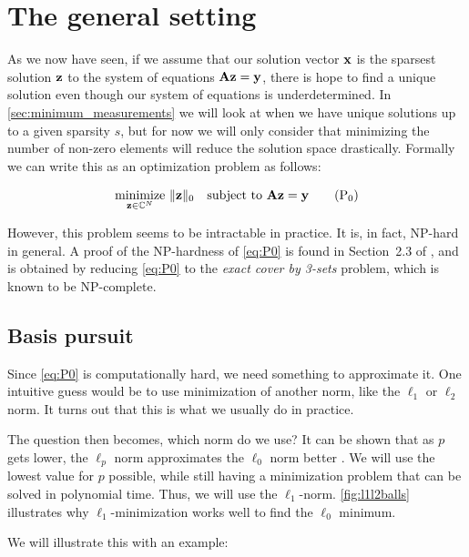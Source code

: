 \section{The general setting}
As we now have seen, if we assume that our solution vector $ \mathbf{x} $ is the sparsest solution $ \mathbf{z} $ to the system of equations $ \mathbf{A}\mathbf{z} = \mathbf{y} $, there is hope to find a unique solution even though our system of equations is underdetermined. In \cref{sec:minimum_measurements} we will look at when we have unique solutions up to a given sparsity $ s $, but for now we will only consider that minimizing the number of non-zero elements will reduce the solution space drastically. Formally we can write this as an optimization problem as follows:

\begin{equation}
	\underset{\mathbf{z} \in \mathbb{C}^{N}}{\text{minimize}}~ \lVert\mathbf{z}\rVert_0
	\quad\text{subject to}~ \mathbf{A}\mathbf{z} = \mathbf{y}
	\tag{P$_0$}
	\label{eq:P0}
\end{equation}

However, this problem seems to be intractable in practice. It is, in fact, NP-hard in general. A proof of the NP-hardness of \eqref{eq:P0} is found in Section~2.3 of \cite{foucart13intro}, and is obtained by reducing \eqref{eq:P0} to the \textit{exact cover by 3-sets} problem, which is known to be NP-complete.





\subsection{Basis pursuit}
Since \eqref{eq:P0} is computationally hard, we need something to approximate it. One intuitive guess would be to use minimization of another norm, like the $ \ell_{1} $ or $ \ell_{2} $ norm. It turns out that this is what we usually do in practice. 

The question then becomes, which norm do we use? It can be shown that  as $ p $ gets lower, the $ \ell_{p} $ norm approximates the $ \ell_{0} $ norm better \cite[Section 4.1]{foucart13intro}. We will use the lowest value for $ p $ possible, while still having a minimization problem that can be solved in polynomial time. Thus, we will use the $ \ell_{1} $-norm. \cref{fig:l1l2balls} illustrates why $ \ell_{1} $-minimization works well to find the $ \ell_{0} $ minimum. 


We will illustrate this with an example:

